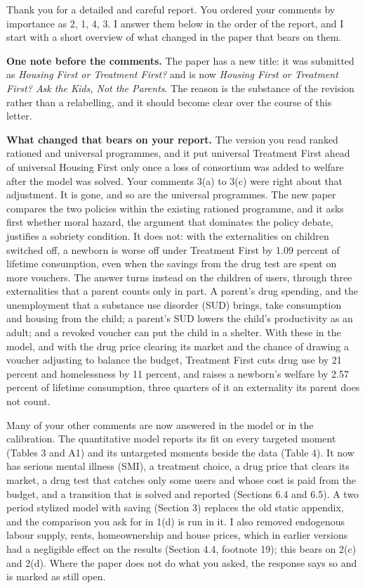 \documentclass[11pt]{article}
\begin{document}

Thank you for a detailed and careful report. You ordered your comments by
importance as 2, 1, 4, 3. I answer them below in the order of the report, and I
start with a short overview of what changed in the paper that bears on them.


{\color{respred}
\textbf{One note before the comments.} The paper has a new title: it was submitted as
\emph{Housing First or Treatment First?} and is now \emph{Housing First or Treatment First? Ask the Kids, Not the Parents}. The reason is the substance of the revision rather than a relabelling, and it
should become clear over the course of this letter.

\textbf{What changed that bears on your report.} The version you read ranked
rationed and universal programmes, and it put universal Treatment First ahead of
universal Housing First only once a loss of consortium was added to welfare after
the model was solved. Your comments 3(a) to 3(c) were right about that
adjustment. It is gone, and so are the universal programmes. The new paper
compares the two policies within the existing rationed programme, and it asks
first whether moral hazard, the argument that dominates the policy debate,
justifies a sobriety condition. It does not: with the externalities on children
switched off, a newborn is worse off under Treatment First by 1.09 percent of
lifetime consumption, even when the savings from the drug test are spent on more
vouchers. The answer turns instead on the children of users, through three externalities
that a parent counts only in part. A parent's drug spending, and the unemployment
that a substance use disorder (SUD) brings, take consumption and housing from the
child; a parent's SUD lowers the child's productivity as an adult; and a revoked
voucher can put the child in a shelter. With these in the model, and with the drug
price clearing its market and the chance of drawing a voucher adjusting to balance
the budget, Treatment First cuts drug use by 21 percent and homelessness by 11
percent, and raises a newborn's welfare by 2.57 percent of lifetime consumption,
three quarters of it an externality its parent does not count.

Many of your other comments are now answered in the model or in the calibration.
The quantitative model reports its fit on every targeted moment (Tables 3 and A1)
and its untargeted moments beside the data (Table 4). It now has serious mental
illness (SMI), a treatment choice, a drug price that clears its market, a drug
test that catches only some users and whose cost is paid from the budget, and a
transition that is solved and reported (Sections 6.4 and 6.5). A two period
stylized model with saving (Section 3) replaces the old static appendix, and the
comparison you ask for in 1(d) is run in it. I also removed endogenous labour
supply, rents, homeownership and house prices, which in earlier versions had a
negligible effect on the results (Section 4.4, footnote 19); this bears on 2(c)
and 2(d). Where the paper does not do what you asked, the response says so and is
marked as still open.
}
\end{document}

